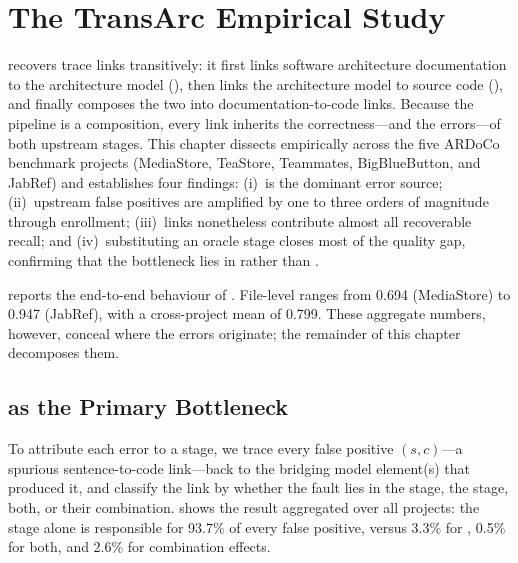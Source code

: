 \chapter{The TransArc Empirical Study}
\label{ch:transarc}

\transarc recovers \sadcode trace links transitively: it first links software
architecture documentation to the architecture model (\sadsam), then links the
architecture model to source code (\samcode), and finally composes the two into
documentation-to-code links. Because the pipeline is a composition, every
\sadcode link inherits the correctness---and the errors---of both upstream
stages. This chapter dissects \transarc empirically across the five ARDoCo
benchmark projects (MediaStore, TeaStore, Teammates, BigBlueButton, and JabRef)
and establishes four findings: (i)~\sadsam is the dominant error source;
(ii)~upstream false positives are amplified by one to three orders of magnitude
through enrollment; (iii)~\sadsam links nonetheless contribute almost all
recoverable recall; and (iv)~substituting an oracle \samcode stage closes most
of the quality gap, confirming that the bottleneck lies in \sadsam rather than
\samcode.

 reports the end-to-end behaviour of \transarc.
File-level \fone ranges from 0.694 (MediaStore) to 0.947 (JabRef), with a
cross-project mean of 0.799. These aggregate numbers, however, conceal where the
errors originate; the remainder of this chapter decomposes them.



\section{\sadsam as the Primary Bottleneck}
\label{sec:transarc:bottleneck}

To attribute each \transarc error to a stage, we trace every false positive
$(s, c)$---a spurious sentence-to-code link---back to the bridging model
element(s) that produced it, and classify the link by whether the fault lies in
the \sadsam stage, the \samcode stage, both, or their combination.
 shows the result aggregated over all projects: the
\sadsam stage alone is responsible for 93.7\% of every \transarc false positive,
versus 3.3\% for \samcode, 0.5\% for both, and 2.6\% for combination effects.

